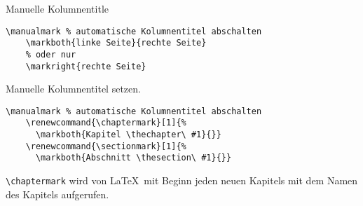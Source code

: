 \begin{Frame}[fragile]{Manuelle Kolumnentitle}
  \begin{lstlisting}[gobble=4]
    \manualmark % automatische Kolumnentitel abschalten
    \markboth{linke Seite}{rechte Seite}
    % oder nur
    \markright{rechte Seite}
  \end{lstlisting}
  Manuelle Kolumnentitel setzen.

  \xxx

  \begin{lstlisting}[gobble=4]
    \manualmark % automatische Kolumnentitel abschalten
    \renewcommand{\chaptermark}[1]{%
      \markboth{Kapitel \thechapter\ #1}{}}
    \renewcommand{\sectionmark}[1]{%
      \markboth{Abschnitt \thesection\ #1}{}}
  \end{lstlisting}
  \lstinline-\chaptermark- wird von \LaTeX\ mit Beginn
  jeden neuen Kapitels mit dem Namen des Kapitels aufgerufen.
\end{Frame}

